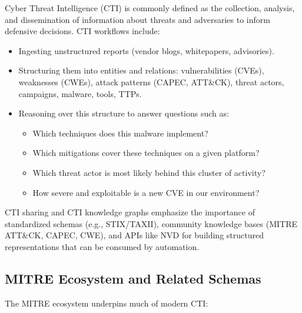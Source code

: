 \documentclass[sigconf]{acmart}
\begin{document}
Cyber Threat Intelligence (CTI) is commonly defined as the collection, analysis, and dissemination of information about threats and adversaries to inform defensive decisions.\cite{mcmillan2013gartner} CTI workflows include:

\begin{itemize}
  \item Ingesting unstructured reports (vendor blogs, whitepapers, advisories).
  \item Structuring them into entities and relations: vulnerabilities (CVEs), weaknesses (CWEs), attack patterns (CAPEC, ATT\&CK), threat actors, campaigns, malware, tools, TTPs.
  \item Reasoning over this structure to answer questions such as:
    \begin{itemize}
      \item Which techniques does this malware implement?
      \item Which mitigations cover these techniques on a given platform?
      \item Which threat actor is most likely behind this cluster of activity?
      \item How severe and exploitable is a new CVE in our environment?
    \end{itemize}
\end{itemize}

CTI sharing and CTI knowledge graphs emphasize the importance of standardized schemas (e.g., STIX/TAXII), community knowledge bases (MITRE ATT\&CK, CAPEC, CWE), and APIs like NVD for building structured representations that can be consumed by automation.\cite{strom2018mitreattck,mitreCVE,mitreCWE,mitreCAPEC}

\subsection{MITRE Ecosystem and Related Schemas}

The MITRE ecosystem underpins much of modern CTI:
\end{document}
